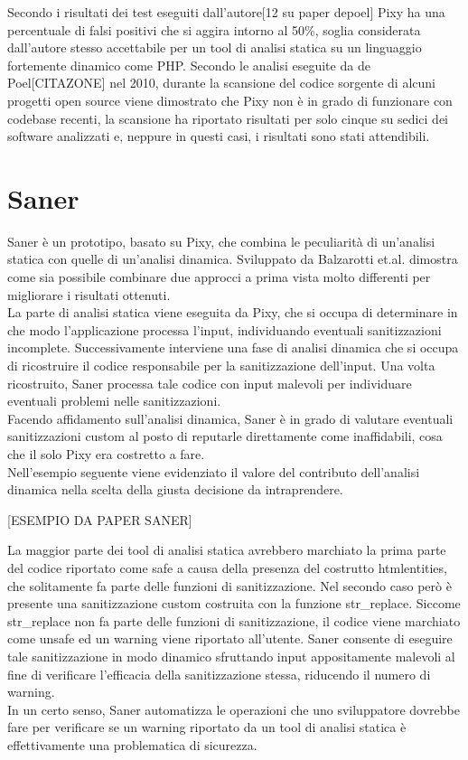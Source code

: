 Secondo i risultati dei test eseguiti dall'autore[12 su paper depoel] Pixy ha una percentuale di falsi positivi che si aggira intorno al 50\%, soglia considerata dall'autore stesso accettabile per un tool di analisi statica su un linguaggio fortemente dinamico come PHP. Secondo le analisi eseguite da de Poel[CITAZONE] nel 2010, durante la scansione del codice sorgente di alcuni progetti open source viene dimostrato che Pixy non è in grado di funzionare con codebase recenti, la scansione ha riportato risultati per solo cinque su sedici dei software analizzati e, neppure in questi casi, i risultati sono stati attendibili.

\section{Saner}
Saner è un prototipo, basato su Pixy, che combina le peculiarità di un'analisi statica con quelle di un'analisi dinamica.
Sviluppato da Balzarotti et.al.\cite{CITAZIONE} dimostra come sia possibile combinare due approcci a prima vista molto differenti per migliorare i risultati ottenuti.\\
La parte di analisi statica viene eseguita da Pixy, che si occupa di determinare in che modo l'applicazione processa l'input, individuando eventuali sanitizzazioni incomplete. Successivamente interviene una fase di analisi dinamica che si occupa di ricostruire il codice responsabile per la sanitizzazione dell'input. Una volta ricostruito, Saner processa tale codice con input malevoli per individuare eventuali problemi nelle sanitizzazioni.\\
Facendo affidamento sull'analisi dinamica, Saner è in grado di valutare eventuali sanitizzazioni custom al posto di reputarle direttamente come inaffidabili, cosa che il solo Pixy era costretto a fare.\\
Nell'esempio seguente viene evidenziato il valore del contributo dell'analisi dinamica nella scelta della giusta decisione da intraprendere.

[ESEMPIO DA PAPER SANER]

La maggior parte dei tool di analisi statica avrebbero marchiato la prima parte del codice riportato come safe a causa della presenza del costrutto htmlentities, che solitamente fa parte delle funzioni di sanitizzazione. Nel secondo caso però è presente una sanitizzazione custom costruita con la funzione str\_replace. Siccome str\_replace non fa parte delle funzioni di sanitizzazione, il codice viene marchiato come unsafe ed un warning viene riportato all'utente. Saner consente di eseguire tale sanitizzazione in modo dinamico sfruttando input appositamente malevoli al fine di verificare l'efficacia della sanitizzazione stessa, riducendo il numero di warning.\\
In un certo senso, Saner automatizza le operazioni che uno sviluppatore dovrebbe fare per verificare se un warning riportato da un tool di analisi statica è effettivamente una problematica di sicurezza.

